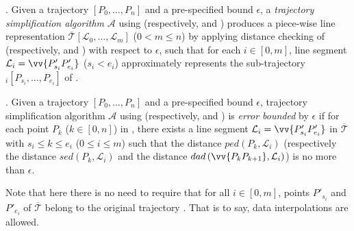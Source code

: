 
. {Given a trajectory $\left[P_0, \dots, P_n\right]$ and a pre-specified bound $\epsilon$, a \emph{trajectory simplification algorithm} $\mathcal{A}$ using \ped (respectively, \sed and \dad) produces a piece-wise line representation $\overline{\mathcal{T}}\left[\mathcal{L}_0, \ldots, \mathcal{L}_m\right]$ ($0< m \le n$) by applying distance checking of \ped (respectively, \sed and \dad) with respect to $\epsilon$, such that for each $i\in[0, m]$, line segment $\mathcal{L}_i = \vv{P'_{s_i}P'_{e_i}}$ ($s_i < e_i$) approximately represents the sub-trajectory $_i\left[P_{s_i}, \dots, P_{e_i}\right]$ of .}

. Given a trajectory $\left[P_0, \dots, P_n\right]$ and a pre-specified bound $\epsilon$,
trajectory simplification algorithm $\mathcal{A}$ using \ped  (respectively, \sed and \dad) is \emph{error bounded} by $\epsilon$ if for each point $P_k$ ($k\in[0,n]$) in , there exists a line segment $\mathcal{L}_i = \vv{P'_{s_i}P'_{e_i}}$ in $\overline{\mathcal{T}}$ with $s_i \le k \le e_i$ ($0\le i\le m$) such that the \ped distance $ped\left(P_k, \mathcal{L}_i\right)$  (respectively the \sed distance $sed\left(P_k, \mathcal{L}_i\right)$ and the \dad distance $dad\left(\vv{P_{k}P_{k+1}}, \mathcal{L}_i\right)$) is no more than  $\epsilon$.
%

Note that here {there is no need} to require that for all $i\in[0,m]$, points $P'_{s_i}$ and $P'_{e_i}$ of $\overline{\mathcal{T}}$ belong to the original trajectory . That is to say, {data interpolations are allowed.}
